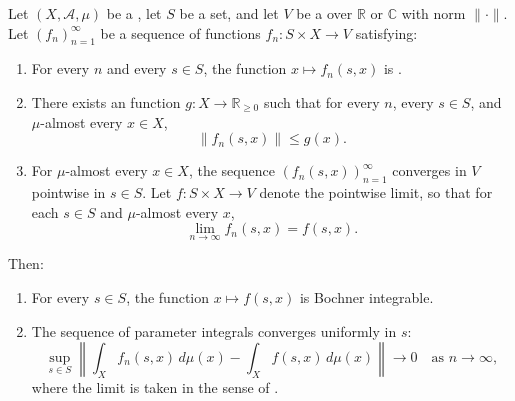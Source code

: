 \begin{theorem} \label{theorem:uniform_convergence_of_parameter_integrals_via_dominated_convergence}
    Let $(X, \mathcal{A}, \mu)$ be a , let $S$ be a set, and let $V$ be a  over $\mathbb{R}$ or $\mathbb{C}$ with norm $\|\cdot\|$. Let $(f_n)_{n=1}^\infty$ be a sequence of functions $f_n : S \times X \to V$ satisfying:

    \begin{enumerate}
        \item For every $n$ and every $s \in S$, the function $x \mapsto f_n(s, x)$ is .
        \item There exists an  function $g : X \to \mathbb{R}_{\ge 0}$ such that for every $n$, every $s \in S$, and $\mu$-almost every $x \in X$,
        $$\|f_n(s, x)\| \le g(x).$$
        \item For $\mu$-almost every $x \in X$, the sequence $(f_n(s, x))_{n=1}^\infty$ converges in $V$ pointwise in $s \in S$. Let $f : S \times X \to V$ denote the pointwise limit, so that for each $s \in S$ and $\mu$-almost every $x$,
        $$\lim_{n \to \infty} f_n(s, x) = f(s, x).$$
    \end{enumerate}

    Then:
    \begin{enumerate}
        \item For every $s \in S$, the function $x \mapsto f(s, x)$ is Bochner integrable.
        \item The sequence of parameter integrals converges uniformly in $s$:
        $$\sup_{s \in S} \left\| \int_X f_n(s, x) \, d\mu(x) - \int_X f(s, x) \, d\mu(x) \right\| \to 0 \quad \text{as } n \to \infty,$$
        where the limit is taken in the sense of .
    \end{enumerate}
\end{theorem}
